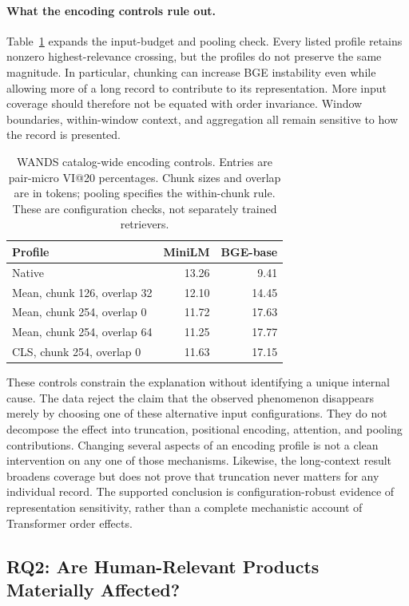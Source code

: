 \paragraph{What the encoding controls rule out.}
Table~\ref{tab:encodingcontrols} expands the input-budget and pooling check. Every listed profile retains nonzero highest-relevance crossing, but the profiles do not preserve the same magnitude. In particular, chunking can increase BGE instability even while allowing more of a long record to contribute to its representation. More input coverage should therefore not be equated with order invariance. Window boundaries, within-window context, and aggregation all remain sensitive to how the record is presented.

\begin{table}[t]
\caption{WANDS catalog-wide encoding controls. Entries are pair-micro VI@20 percentages. Chunk sizes and overlap are in tokens; pooling specifies the within-chunk rule. These are configuration checks, not separately trained retrievers.}
\label{tab:encodingcontrols}\centering\small
\begin{tabular}{lrr}\toprule
Profile & MiniLM & BGE-base\\\midrule
Native & 13.26 & 9.41\\
Mean, chunk 126, overlap 32 & 12.10 & 14.45\\
Mean, chunk 254, overlap 0 & 11.72 & 17.63\\
Mean, chunk 254, overlap 64 & 11.25 & 17.77\\
CLS, chunk 254, overlap 0 & 11.63 & 17.15\\\bottomrule
\end{tabular}
\end{table}

These controls constrain the explanation without identifying a unique internal cause. The data reject the claim that the observed phenomenon disappears merely by choosing one of these alternative input configurations. They do not decompose the effect into truncation, positional encoding, attention, and pooling contributions. Changing several aspects of an encoding profile is not a clean intervention on any one of those mechanisms. Likewise, the long-context result broadens coverage but does not prove that truncation never matters for any individual record. The supported conclusion is configuration-robust evidence of representation sensitivity, rather than a complete mechanistic account of Transformer order effects.

\subsection{RQ2: Are Human-Relevant Products Materially Affected?}

